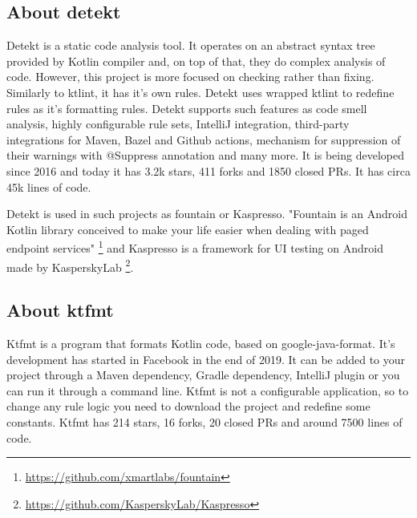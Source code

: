 \subsection{About detekt}
\par Detekt is a static code analysis tool. It operates on an abstract syntax tree provided by Kotlin compiler and, on top of that, they do complex analysis of code. However, this project is more focused on checking rather than fixing. Similarly to ktlint, it has it's own rules. Detekt uses wrapped ktlint to redefine rules as it's formatting rules. Detekt supports such features as code smell analysis, highly configurable rule sets, IntelliJ integration, third-party integrations for Maven, Bazel and Github actions, mechanism for suppression of their warnings with @Suppress annotation and many more. It is being developed since 2016 and today it has 3.2k stars, 411 forks and 1850 closed PRs. It has circa 45k lines of code.
\par Detekt is used in such projects as fountain or Kaspresso. "Fountain is an Android Kotlin library conceived to make your life easier when dealing with paged endpoint services" \footnote{\url{https://github.com/xmartlabs/fountain}} and Kaspresso is a framework for UI testing on Android made by KasperskyLab \footnote{\url{https://github.com/KasperskyLab/Kaspresso}}.

\subsection{About ktfmt}
\par Ktfmt is a program that formats Kotlin code, based on google-java-format. It's development has started in Facebook in the end of 2019. It can be added to your project through a Maven dependency, Gradle dependency, IntelliJ plugin or you can run it through a command line. Ktfmt is not a configurable application, so to change any rule logic you need to download the project and redefine some constants. Ktfmt has 214 stars, 16 forks, 20 closed PRs and around 7500 lines of code. 

